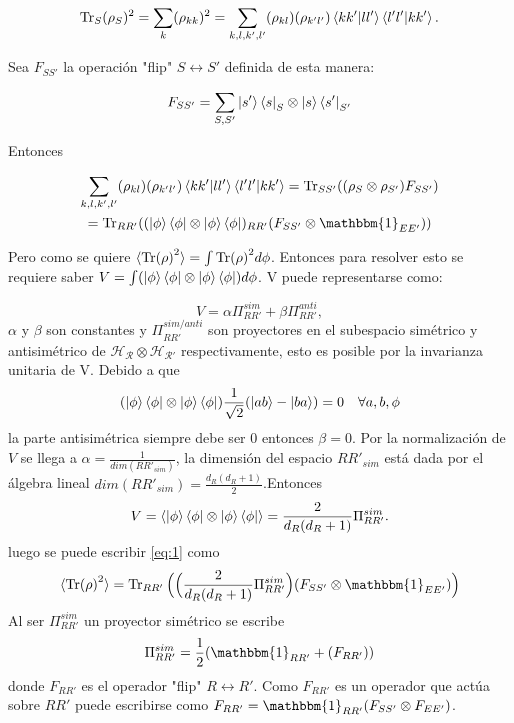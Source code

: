 \begin{equation}
\Tr_{S} (\rho_{S})^2 = \sum_{k} (\rho_{kk})^{2} = \sum_{k,l,k',l'}(\rho_{kl})(\rho_{k'l'}) \bra{kk'}\ket{ll'}\bra{l'l'}\ket{kk'}.
\end{equation}

Sea $F_{SS'}$ la operación "flip" $S \longleftrightarrow S'$ definida de esta manera:

\begin{equation}
F_{SS'} =\sum_{S,S'} \ket{s'}\bra{s}_{S} \otimes \ket{s}\bra{s'}_{S'}
\end{equation}

Entonces

\begin{multline} \label{eq:1}
\sum_{k,l,k',l'}(\rho_{kl})(\rho_{k'l'}) \bra{kk'}\ket{ll'}\bra{l'l'}\ket{kk'}= \Tr_{SS'} ((\rho_{S} \otimes \rho_{S'})F_{SS'})\\
=\Tr_{RR'}((\ket{\phi} \bra{\phi} \otimes \ket{\phi} \bra{\phi})_{RR'}(F_{SS'} \otimes \mathbbm{1}_{EE'}))
\end{multline}

Pero como se quiere $\langle \Tr (\rho)^{2} \rangle= \int \Tr (\rho)^{2} d\phi $. Entonces para resolver esto se requiere saber $V=\int (\ket{\phi} \bra{\phi} \otimes \ket{\phi} \bra{\phi})d\phi$. V puede representarse como:

\begin{equation}
V= \alpha \Pi_{RR'}^{sim} + \beta \Pi_{RR'}^{anti},
\end{equation}
$\alpha$ y $\beta$ son constantes y $\Pi_{RR'}^{sim/anti}$ son proyectores en el subespacio simétrico y antisimétrico de $\mathcal{H_{R} \otimes H_{R'}}$ respectivamente, esto es posible por la invarianza unitaria de V. Debido a que 
\begin{equation}
(\ket{\phi} \bra{\phi} \otimes \ket{\phi} \bra{\phi})\frac{1}{\sqrt{2}} ( \ket{ab} -\ket{ba})=0  \quad  \forall a,b,\phi
\end{equation}
la parte antisimétrica siempre debe ser 0 entonces $\beta=0$. Por la normalización de $V$ se llega a $\alpha= \frac{1}{dim(RR'_{sim})}$, la dimensión del espacio $RR'_{sim}$ está dada por el álgebra lineal $dim(RR'_{sim})= \frac{d_{R}(d_{R}+1)}{2}$.Entonces
\begin{equation}
V= \langle \ket{\phi} \bra{\phi} \otimes \ket{\phi} \bra{\phi} \rangle = \frac{2}{d_{R}(d_{R} +1)} \Pi_{RR'}^{sim}.
\end{equation}
luego se puede escribir \ref{eq:1} como 
\begin{equation}
\langle \Tr (\rho)^{2} \rangle = \Tr_{RR'} \Big( \Big( \frac{2}{d_{R}(d_{R} +1)} \Pi_{RR'}^{sim} \Big)(F_{SS'} \otimes \mathbbm{1}_{EE'}) \Big)
\end{equation}
Al ser $\Pi_{RR'}^{sim}$ un proyector simétrico se escribe
\begin{equation}
\Pi_{RR'}^{sim}=\frac{1}{2}(\mathbbm{1}_{RR'}+(F_{RR'} ))
\end{equation}
donde $F_{RR'}$ es el operador "flip"  $R \longleftrightarrow R'$. Como $F_{RR'}$ es un operador que actúa sobre $RR'$ puede escribirse como $F_{RR'}= \mathbbm{1}_{RR'}(F_{SS'} \otimes F_{EE'})$.

